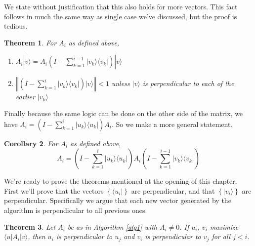 \documentclass{amsbook}
\newtheorem{theorem}{Theorem}
\newtheorem{corollary}[theorem]{Corollary}
\begin{document}
We state without justification that this also holds for more vectors.  This fact follows in much the same way as single case we've discussed, but the proof is tedious.

 \begin{theorem}
\label{lil_projection_thm}
For $A_i$ as defined above,
\begin{enumerate}
\item $A_i| v \rangle=A_i\left(I-\sum_{k=1}^{i-1}| v _k\rangle\langle v _k|\right)| v \rangle$
\item $\left\Vert\left(I-\sum_{k=1}^{i}| v _k\rangle\langle v _k|\right)| v \rangle\right\Vert<1$ unless $| v \rangle$ is perpendicular to each of the earlier $| v _k\rangle$
\end{enumerate}
 \end{theorem}

Finally because the same logic can be done on the other side of the matrix, we have $A_i=\left(I-\sum_{k=1}^i| u _k\rangle\langle u _k|\right)A_i$.  So we make a more general statement.

\begin{corollary}
\label{double_side_proj}
For $A_i$ as defined above,
$$
A_i=\left(I-\sum_{k=1}^i| u _k\rangle\langle u _k|\right)A_i\left(I-\sum_{k=1}^{i-1}| v _k\rangle\langle v _k|\right)
$$
\end{corollary}

We're ready to prove the theorems mentioned at the opening of this chapter.  First we'll prove that the vectors $\left\{\langle u_i|\right\}$ are perpendicular, and that $\left\{|v_i\rangle\right\}$ are perpendicular.  Specifically we argue that each new vector generated by the algorithm is perpendicular to all previous ones.

 \begin{theorem}
Let $A_i$ be as in Algorithm \ref{alg1} with $A_i\neq0$.  If $u_i$, $v_i$ maximize $\langle u |A_i| v \rangle$, then $u_i$ is perpendicular to $u_j$ and $v_i$ is perpendicular to $v_j$ for all $j<i$.
 \end{theorem}
\end{document}
